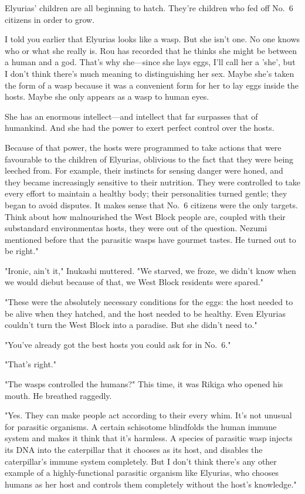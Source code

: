 Elyurias' children are all beginning to hatch. They're children who fed
off No.~6 citizens in order to grow.

I told you earlier that Elyurias looks like a wasp. But she isn't one.
No one knows who or what she really is. Rou has recorded that he thinks
she might be between a human and a god. That's why she---since she lays
eggs, I'll call her a 'she', but I don't think there's much meaning to
distinguishing her sex. Maybe she's taken the form of a wasp because it
was a convenient form for her to lay eggs inside the hosts. Maybe she
only appears as a wasp to human eyes.

She has an enormous intellect---and intellect that far surpasses that of
humankind. And she had the power to exert perfect control over the
hosts.

Because of that power, the hosts were programmed to take actions that
were favourable to the children of Elyurias, oblivious to the fact that
they were being leeched from. For example, their instincts for sensing
danger were honed, and they became increasingly sensitive to their
nutrition. They were controlled to take every effort to maintain a
healthy body; their personalities turned gentle; they began to avoid
disputes. It makes sense that No.~6 citizens were the only targets.
Think about how malnourished the West Block people are, coupled with
their substandard environment\el as hosts, they were out of the
question. Nezumi mentioned before that the parasitic wasps have gourmet
tastes. He turned out to be right."

"Ironic, ain't it," Inukashi muttered. "We starved, we froze, we didn't
know when we would die\el but because of that, we West Block residents
were spared."

"These were the absolutely necessary conditions for the eggs: the host
needed to be alive when they hatched, and the host needed to be healthy.
Even Elyurias couldn't turn the West Block into a paradise. But she
didn't need to."

"You've already got the best hosts you could ask for in No.~6."

"That's right."

"The wasps controlled the humans?" This time, it was Rikiga who opened
his mouth. He breathed raggedly.

"Yes. They can make people act according to their every whim. It's not
unusual for parasitic organisms. A certain schisotome blindfolds the
human immune system and makes it think that it's harmless. A species of
parasitic wasp injects its DNA into the caterpillar that it chooses as
its host, and disables the caterpillar's immune system completely. But I
don't think there's any other example of a highly-functional parasitic
organism like Elyurias, who chooses humans as her host and controls them
completely without the host's knowledge."

